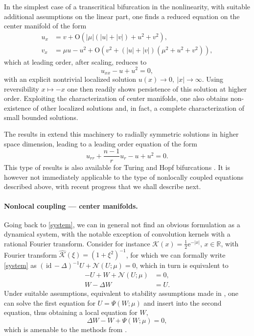 \documentclass[10pt]{article}
\newcommand{\R}{\mathbb{R}}
\newcommand{\rmO}{\mathrm{O}}
\newcommand{\rme}{\mathrm{e}}
\newcommand{\id}{\mathrm{\,id}\,}
\newcommand{\Nl}{\mathcal{N}}
\newcommand{\K}{\mathcal{K}}
\begin{document}
In the simplest case of a transcritical bifurcation in the nonlinearity, with suitable additional assumptions on the linear part, one finds a reduced equation on the center manifold of the form 
\begin{align*}
u_x&=v+\rmO\left(|\mu|(|u|+|v|)+u^2+v^2\right),\\
v_x&=\mu u - u^2 + \rmO\left(v^2+(|u|+|v|)(\mu^2+u^2+v^2)\right),
\end{align*}
which at leading order, after scaling, reduces to 
\begin{equation}\label{e:tc}
u_{xx}- u + u^2=0,
\end{equation}
with an explicit nontrivial localized solution $u(x)\to 0,\ |x|\to\infty$. Using reversibility $x\mapsto -x$ one then readily shows persistence of this solution at higher order. Exploiting the characterization of center manifolds, one also obtains non-existence of other localized solutions and, in fact, a complete characterization of small bounded solutions. 

The results in \cite{Srad} extend this machinery to radially symmetric solutions in higher space dimension, leading to a leading order equation of the form 
\[
u_{rr}+\frac{n-1}{r}u_r - u + u^2=0.
\]
This type of results is also available for Turing and Hopf bifurcations \cite{Srad}. It is however not immediately applicable to the type of nonlocally coupled equations described above, with recent progress that we shall describe next. 


\paragraph{Nonlocal coupling --- center manifolds.} Going back to \eqref{system}, we can in general not find an obvious formulation as a dynamical system, with the notable exception of convolution kernels with a rational Fourier transform. Consider for instance $\K(x)=\frac{1}{2}\rme^{-|x|}$, $x\in\R$, with Fourier transform $\hat{\K}(\xi)=(1+\xi^2)^{-1}$, for which we can formally write \eqref{system} as $(\id -\Delta)^{-1}U+\Nl(U;\mu)=0$, which in turn is equivalent to 
\begin{align*}
-U+W+\Nl(U;\mu)&=0,\\
W-\Delta W &=U.
\end{align*}
Under suitable assumptions, equivalent to stability assumptions made in \cite{Srad}, one can solve the first equation for $U=\Psi(W;\mu)$ and insert into the second equation, thus obtaining a local equation for $W$, 
\[
\Delta W -W + \Psi(W;\mu)=0,
\]
which is amenable to the methods from \cite{Srad}. 
\end{document}
